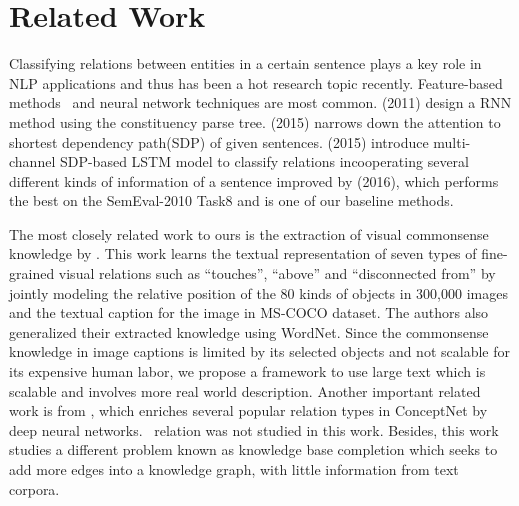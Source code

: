 \section{Related Work}
Classifying relations between entities in a certain sentence plays a key role in NLP applications and thus has been a hot research topic recently.
Feature-based methods~\cite{sem} and neural network techniques are most common. 
\citeauthor{socher2011semi} (2011) design a RNN method using the constituency parse tree. \citeauthor{ebrahimi2015chain} (2015) narrows down the attention to shortest dependency path(SDP) of given sentences. 
\citeauthor{xu2015classifying} (2015) introduce multi-channel SDP-based LSTM model to classify relations incooperating several different kinds of information of a sentence improved by \citeauthor{xu2016improved} (2016), which performs the best on the SemEval-2010 Task8 and is one of our baseline methods.

The most closely related work to ours is the extraction of
visual commonsense knowledge by \citeauthor{yatskar2016stating}. 
This work learns the textual representation of seven types of fine-grained 
visual relations such as ``touches'', ``above'' and ``disconnected from'' 
by jointly modeling the relative position of the 80 kinds of objects in 300,000 images
and the textual caption for the image in MS-COCO dataset\cite{lin2014microsoft}. 
The authors also generalized their extracted knowledge using WordNet. 
Since the commonsense knowledge in image captions is limited by its selected objects and not scalable for its expensive human labor, we propose a framework to use large text which is scalable and involves more real world description. 
Another important related work is from \citeauthor{li2016commonsense}, which enriches
several popular relation types in ConceptNet by deep neural networks.
\lnear~relation was not studied in this work. Besides, this work studies
a different problem known as knowledge base completion which seeks to
add more edges into a knowledge graph, with little information from
text corpora. 
